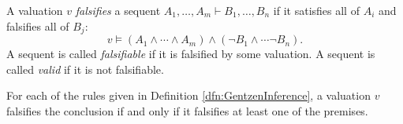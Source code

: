 \begin{page}
\setcounter{section}{2}
\setcounter{subsection}{4}
\setcounter{dfn}{8}
\label{portion:441}

\begin{dfn}
\label{dfn:FalsifySequent}
A valuation $v$ \emph{falsifies} a sequent $A_1, \ldots, A_m \vdash B_1, \ldots, B_n$ if it satisfies all of $A_i$ and falsifies all of $B_j$:
\[
v \vDash (A_1 \wedge \cdots \wedge A_m) \wedge (\neg B_1 \wedge \cdots \neg B_n).
\]
A sequent is called \emph{falsifiable} if it is falsified by some valuation.
A sequent is called \emph{valid} if it is not falsifiable.
\end{dfn}

\end{page}

\begin{page}
\setcounter{section}{2}
\setcounter{subsection}{4}
\setcounter{dfn}{9}
\label{portion:444}

\begin{lem}
\label{lem:RuleTrees}
For each of the rules given in Definition \ref{dfn:GentzenInference},
a valuation $v$ falsifies the conclusion if and only if it falsifies at least one of the premises.
\end{lem}

\end{page}

